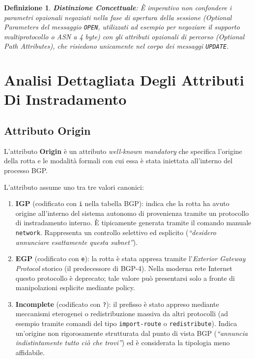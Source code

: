 \documentclass[11pt, a4paper]{article}
\newtheorem{theorem}{Definizione}
\begin{document}
\begin{theorem}
\textbf{Distinzione Concettuale}: È imperativo non confondere i parametri opzionali negoziati nella fase di apertura della sessione (\emph{Optional Parameters} del messaggio \texttt{OPEN}, utilizzati ad esempio per negoziare il supporto multiprotocollo o ASN a 4 byte) con gli attributi opzionali di percorso (\emph{Optional Path Attributes}), che risiedono unicamente nel corpo dei messaggi \texttt{UPDATE}.
\end{theorem}


\section{Analisi Dettagliata Degli Attributi Di Instradamento}

\subsection{Attributo Origin}

L'attributo \textbf{Origin} è un attributo \emph{well-known mandatory} che specifica l'origine della rotta e le modalità formali con cui essa è stata iniettata all'interno del processo BGP.


L'attributo assume uno tra tre valori canonici:
\begin{enumerate}
    \item \textbf{IGP} (codificato con \texttt{i} nella tabella BGP): indica che la rotta ha avuto origine all'interno del sistema autonomo di provenienza tramite un protocollo di instradamento interno. È tipicamente generata tramite il comando manuale \texttt{network}. Rappresenta un controllo selettivo ed esplicito (\emph{``desidero annunciare esattamente questa subnet''}).
    \item \textbf{EGP} (codificato con \texttt{e}): la rotta è stata appresa tramite l'\emph{Exterior Gateway Protocol} storico (il predecessore di BGP-4). Nella moderna rete Internet questo protocollo è deprecato; tale valore può presentarsi solo a fronte di manipolazioni esplicite mediante policy.
    \item \textbf{Incomplete} (codificato con \texttt{?}): il prefisso è stato appreso mediante meccanismi eterogenei o redistribuzione massiva da altri protocolli (ad esempio tramite comandi del tipo \texttt{import-route} o \texttt{redistribute}). Indica un'origine non rigorosamente strutturata dal punto di vista BGP (\emph{``annuncia indistintamente tutto ciò che trovi''}) ed è considerata la tipologia meno affidabile.
\end{enumerate}
\end{document}
